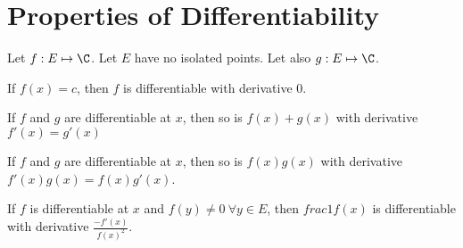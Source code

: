 \documentclass[../Main.tex]{subfiles}
\begin{document}
\section{Properties of Differentiability}
\begin{propositions}{
        Let $f : E \mapsto \C$. Let $E$ have no isolated points. Let also $g : E \mapsto \C$.
        \label{propsDiffProperties}
    }
    \item If $f(x) = c$, then $f$ is differentiable with derivative 0. \label{propConstantDiffability}    
    \item If $f$ and $g$ are differentiable at $x$, then so is $f(x) + g(x)$ with derivative $f'(x) = g'(x)$ \label{propSumDiffability}
    \item If $f$ and $g$ are differentiable at $x$, then so is $f(x)g(x)$ with derivative $f'(x) g(x) = f(x) g'(x)$. \label{propProdDiffability}
    \item If $f$ is differentiable at $x$ and $f(y) \neq 0~\forall y \in E$, then $frac{1}{f(x)}$ is differentiable with derivative $\frac{-f'(x)}{f(x)^2}$. \label{propReciprocalDiffability}
\end{propositions}
\end{document}
